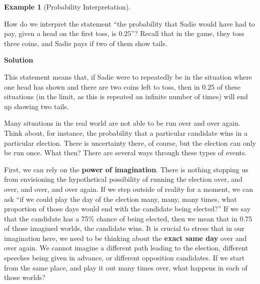 \documentclass[
  letterpaper,
  DIV=11,
  numbers=noendperiod]{scrreprt}
\theoremstyle{definition}
\theoremstyle{definition}
\newtheorem{example}{Example}[chapter]
\theoremstyle{definition}
\theoremstyle{remark}
\begin{document}
\begin{example}[Probability
Interpretation]\protect\hypertarget{exm-prob-interp}{}\label{exm-prob-interp}

How do we interpret the statement ``the probability that Sadie would
have had to pay, given a head on the first toss, is \(0.25\)''? Recall
that in the game, they toss three coins, and Sadie pays if two of them
show tails.

\begin{tcolorbox}[enhanced jigsaw, colback=white, colframe=quarto-callout-color-frame, arc=.35mm, leftrule=.75mm, rightrule=.15mm, opacityback=0, breakable, bottomrule=.15mm, left=2mm, toprule=.15mm]

\vspace{-3mm}\textbf{Solution}\vspace{3mm}

This statement means that, if Sadie were to repeatedly be in the
situation where one head has shown and there are two coins left to toss,
then in \(0.25\) of these situations (in the limit, as this is repeated
an infinite number of times) will end up showing two tails.

\end{tcolorbox}

\end{example}

Many situations in the real world are not able to be run over and over
again. Think about, for instance, the probability that a particular
candidate wins in a particular election. There is uncertainty there, of
course, but the election can only be run once. What then? There are
several ways through these types of events.

First, we can rely on the \textbf{power of imagination}. There is
nothing stopping us from envisioning the hypothetical possibility of
running the election over, and over, and over, and over again. If we
step outside of reality for a moment, we can ask ``if we could play the
day of the election many, many, many times, what proportion of those
days would end with the candidate being elected?'' If we say that the
candidate has a 75\% chance of being elected, then we mean that in
\(0.75\) of those imagined worlds, the candidate wins. It is crucial to
stress that in our imagination here, we need to be thinking about the
\textbf{exact same day} over and over again. We cannot imagine a
different path leading to the election, different speeches being given
in advance, or different opposition candidates. If we start from the
same place, and play it out many times over, what happens in each of
those worlds?
\end{document}
